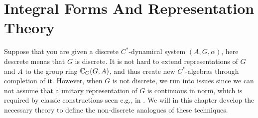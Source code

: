 \chapter{Integral Forms And Representation Theory}
Suppose that you are given a discrete $C^*$-dynamical system $(A,G,\alpha)$, here descrete menas that $G$ is discrete. It is not hard to extend representations of $G$ and $A$ to the group ring $\mathbb{C}_C(G,A)$, and thus create new $C^*$-algebras through completion of it. However, when $G$ is not discrete, we run into issues since we can not assume that a unitary representation of $G$ is continuous in norm, which is required by classic constructions seen e.g., in \cite{brown2008c}. We will in this chapter develop the necessary theory to define the non-discrete analogues of these techniques.


